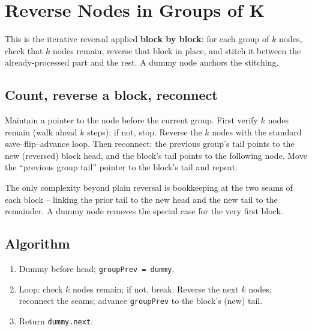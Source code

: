 \section{Reverse Nodes in Groups of K}
\label{sec:ll-reverse-k-group}


\begin{patternbox}
This is the iterative reversal applied \textbf{block by block}: for each
group of $k$ nodes, check that $k$ nodes remain, reverse that block in
place, and stitch it between the already-processed part and the rest. A
dummy node anchors the stitching.
\end{patternbox}

\subsection*{Count, reverse a block, reconnect}

Maintain a pointer to the node before the current group. First verify $k$
nodes remain (walk ahead $k$ steps); if not, stop. Reverse the $k$ nodes
with the standard save--flip--advance loop. Then reconnect: the previous
group's tail points to the new (reversed) block head, and the block's tail
points to the following node. Move the ``previous group tail'' pointer to
the block's tail and repeat.

\begin{ideabox}
The only complexity beyond plain reversal is bookkeeping at the two seams of
each block -- linking the prior tail to the new head and the new tail to the
remainder. A dummy node removes the special case for the very first block.
\end{ideabox}

\subsection*{Algorithm}

\begin{enumerate}
  \item Dummy before head; \texttt{groupPrev = dummy}.
  \item Loop: check $k$ nodes remain; if not, break. Reverse the next $k$
        nodes; reconnect the seams; advance \texttt{groupPrev} to the
        block's (new) tail.
  \item Return \texttt{dummy.next}.
\end{enumerate}

